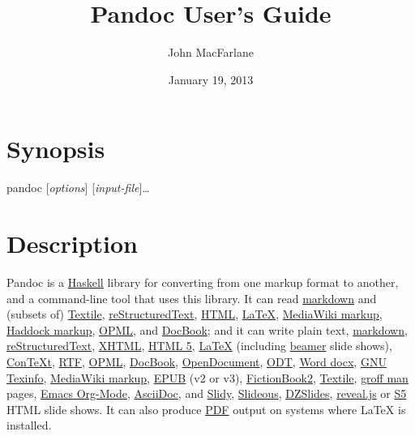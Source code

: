\documentclass[]{article}
\title{Pandoc User's Guide}
\author{John MacFarlane}
\date{January 19, 2013}
\begin{document}
\maketitle

\section{Synopsis}

pandoc {[}\emph{options}{]} {[}\emph{input-file}{]}\ldots{}

\section{Description}

Pandoc is a \href{http://www.haskell.org/}{Haskell} library for
converting from one markup format to another, and a command-line tool
that uses this library. It can read
\href{http://daringfireball.net/projects/markdown/}{markdown} and
(subsets of) \href{http://redcloth.org/textile}{Textile},
\href{http://docutils.sourceforge.net/docs/ref/rst/introduction.html}{reStructuredText},
\href{http://www.w3.org/TR/html40/}{HTML},
\href{http://www.latex-project.org/}{LaTeX},
\href{http://www.mediawiki.org/wiki/Help:Formatting}{MediaWiki markup},
\href{http://www.haskell.org/haddock/doc/html/ch03s08.html}{Haddock
markup}, \href{http://dev.opml.org/spec2.html}{OPML}, and
\href{http://www.docbook.org/}{DocBook}; and it can write plain text,
\href{http://daringfireball.net/projects/markdown/}{markdown},
\href{http://docutils.sourceforge.net/docs/ref/rst/introduction.html}{reStructuredText},
\href{http://www.w3.org/TR/xhtml1/}{XHTML},
\href{http://www.w3.org/TR/html5/}{HTML 5},
\href{http://www.latex-project.org/}{LaTeX} (including
\href{http://www.tex.ac.uk/CTAN/macros/latex/contrib/beamer}{beamer}
slide shows), \href{http://www.pragma-ade.nl/}{ConTeXt},
\href{http://en.wikipedia.org/wiki/Rich\_Text\_Format}{RTF},
\href{http://dev.opml.org/spec2.html}{OPML},
\href{http://www.docbook.org/}{DocBook},
\href{http://opendocument.xml.org/}{OpenDocument},
\href{http://en.wikipedia.org/wiki/OpenDocument}{ODT},
\href{http://www.microsoft.com/interop/openup/openxml/default.aspx}{Word
docx}, \href{http://www.gnu.org/software/texinfo/}{GNU Texinfo},
\href{http://www.mediawiki.org/wiki/Help:Formatting}{MediaWiki markup},
\href{http://www.idpf.org/}{EPUB} (v2 or v3),
\href{http://www.fictionbook.org/index.php/Eng:XML\_Schema\_Fictionbook\_2.1}{FictionBook2},
\href{http://redcloth.org/textile}{Textile},
\href{http://developer.apple.com/DOCUMENTATION/Darwin/Reference/ManPages/man7/groff\_man.7.html}{groff
man} pages, \href{http://orgmode.org}{Emacs Org-Mode},
\href{http://www.methods.co.nz/asciidoc/}{AsciiDoc}, and
\href{http://www.w3.org/Talks/Tools/Slidy/}{Slidy},
\href{http://goessner.net/articles/slideous/}{Slideous},
\href{http://paulrouget.com/dzslides/}{DZSlides},
\href{http://lab.hakim.se/reveal-js/}{reveal.js} or
\href{http://meyerweb.com/eric/tools/s5/}{S5} HTML slide shows. It can
also produce \href{http://www.adobe.com/pdf/}{PDF} output on systems
where LaTeX is installed.
\end{document}
